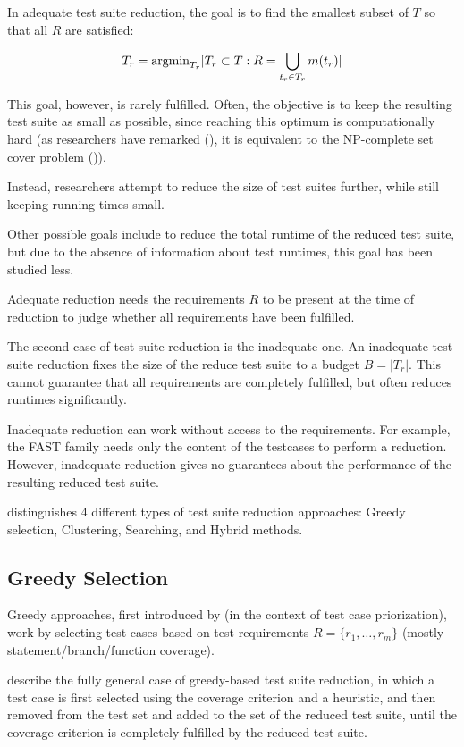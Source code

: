 In adequate test suite reduction, the goal is to find the smallest subset
of $T$ so that all $R$ are satisfied:

$$T_{r}=\hbox{argmin}_{T_{r}} |T_{r} \subset T: R=\bigcup_{t_{r} \in T_{r}} m(t_{r})|$$

This goal, however, is rarely fulfilled. Often, the objective is to
keep the resulting test suite as small as possible, since reaching
this optimum is computationally hard (as researchers have remarked
(\cite{khan2016survey}), it is equivalent to the NP-complete set cover
problem (\cite{garey1979computers})).

Instead, researchers attempt to reduce the size of test suites further,
while still keeping running times small.

Other possible goals include to reduce the total runtime of the reduced
test suite, but due to the absence of information about test runtimes,
this goal has been studied less. %

Adequate reduction needs the requirements $R$ to be present at the time
of reduction to judge whether all requirements have been fulfilled.

The second case of test suite reduction is the inadequate one. An
inadequate test suite reduction fixes the size of the reduce test suite
to a budget $B=|T_{r}|$. This cannot guarantee that all requirements
are completely fulfilled, but often reduces runtimes significantly.

Inadequate reduction can work without access to the requirements.
For example, the FAST family needs only the content of the testcases to
perform a reduction. However, inadequate reduction gives no guarantees
about the performance of the resulting reduced test suite.

\cite{khan2018systematic} distinguishes 4 different types of test
suite reduction approaches: Greedy selection, Clustering, Searching,
and Hybrid methods.

\subsection{Greedy Selection}

Greedy approaches, first introduced by \cite{rothermel2001prioritizing}
(in the context of test case priorization), work by selecting test
cases based on test requirements $R=\{r_1, \dots, r_{m}\}$ (mostly
statement/branch/function coverage).

\cite{khan2018systematic} describe the fully general case of greedy-based
test suite reduction, in which a test case is first selected using
the coverage criterion and a heuristic, and then removed from the test
set and added to the set of the reduced test suite, until the coverage
criterion is completely fulfilled by the reduced test suite.

